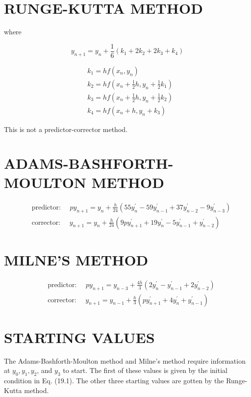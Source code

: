 \documentclass[10pt]{article}
\begin{document}
\section*{RUNGE-KUTTA METHOD}
where


\begin{equation*}
y_{n+1}=y_{n}+\frac{1}{6}\left(k_{1}+2 k_{2}+2 k_{3}+k_{4}\right) \tag{19.5}
\end{equation*}


$$
\begin{aligned}
& k_{1}=h f\left(x_{n}, y_{n}\right) \\
& k_{2}=h f\left(x_{n}+\frac{1}{2} h, y_{n}+\frac{1}{2} k_{1}\right) \\
& k_{3}=h f\left(x_{n}+\frac{1}{2} h, y_{n}+\frac{1}{2} k_{2}\right) \\
& k_{4}=h f\left(x_{n}+h, y_{n}+k_{3}\right)
\end{aligned}
$$

This is not a predictor-corrector method.

\section*{ADAMS-BASHFORTH-MOULTON METHOD}

\begin{align*}
& \text { predictor: } \quad p y_{n+1}=y_{n}+\frac{h}{24}\left(55 y_{n}^{\prime}-59 y_{n-1}^{\prime}+37 y_{n-2}^{\prime}-9 y_{n-3}^{\prime}\right)  \tag{19.6}\\
& \text { corrector: } \quad y_{n+1}=y_{n}+\frac{h}{24}\left(9 p y_{n+1}^{\prime}+19 y_{n}^{\prime}-5 y_{n-1}^{\prime}+y_{n-2}^{\prime}\right)
\end{align*}


\section*{MILNE'S METHOD}

\begin{align*}
& \text { predictor: } \quad p y_{n+1}=y_{n-3}+\frac{4 h}{3}\left(2 y_{n}^{\prime}-y_{n-1}^{\prime}+2 y_{n-2}^{\prime}\right)  \tag{19.7}\\
& \text { corrector: } \quad y_{n+1}=y_{n-1}+\frac{h}{3}\left(p y_{n+1}^{\prime}+4 y_{n}^{\prime}+y_{n-1}^{\prime}\right)
\end{align*}


\section*{STARTING VALUES}
The Adams-Bashforth-Moulton method and Milne's method require information at $y_{0}, y_{1}, y_{2}$, and $y_{3}$ to start. The first of these values is given by the initial condition in Eq. (19.1). The other three starting values are gotten by the Runge-Kutta method.
\end{document}
